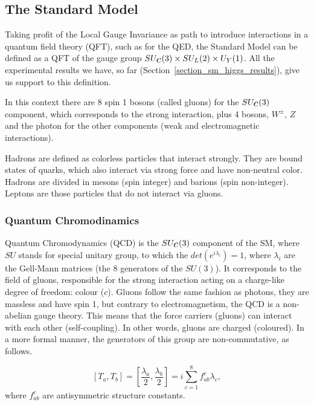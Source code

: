 \subsection{The Standard Model}

Taking profit of the Local Gauge Invariance as path to introduce interactions in a quantum field theory (QFT), such as for the QED, the Standard Model can be defined as a QFT of the gauge group $SU_{\scaleto{c}{5pt}}(3) \times SU_{\scaleto{L}{5pt}}(2) \times U_{\scaleto{Y}{5pt}}(1)$. All the experimental results we have, so far (Section~\ref{section_sm_higgs_results}), give us support to this definition. 

In this context there are 8 spin 1 bosons (called gluons) for the $SU_{\scaleto{c}{5pt}}(3)$ component, which corresponds to the strong interaction, plus 4 bosons, $W^\pm$, $Z$ and the photon for the other components (weak and electromagnetic interactions).

Hadrons are defined as colorless particles that interact strongly. They are bound states of quarks, which also interact via strong force and have non-neutral color. Hadrons are divided in mesons (spin integer) and barions (spin non-integer). Leptons are those particles that do not interact via gluons.

\subsubsection{Quantum Chromodinamics}

Quantum Chromodynamics (QCD) is the $SU_{\scaleto{c}{5pt}}(3)$ component of the SM, where $SU$ stands for special unitary group, to which the $det(e^{i\lambda_i}) = 1$, where $\lambda_i$ are the Gell-Mann matrices (the 8 generators of the $SU(3)$). It corresponds to the field of gluons, responsible for the strong interaction acting on a charge-like degree of freedom: colour ($c$). Gluons follow the same fashion as photons, they are massless and have spin 1, but contrary to electromagnetism, the QCD is a non-abelian gauge theory. This means that the force carriers (gluons) can interact with each other (self-coupling). In other words, gluons are charged (coloured). In a more formal manner, the generators of this group are non-commutative, as follows.

\begin{equation}
    \left[ T_a, T_b \right] = \left[ \frac{\lambda_a}{2}, \frac{\lambda_b}{2} \right] = i \sum_{c=1}^8 f_{ab}^c\lambda_c,
\label{qcd_commutators}
\end{equation}
where $f_{ab}^c$ are antisymmetric structure constants.

